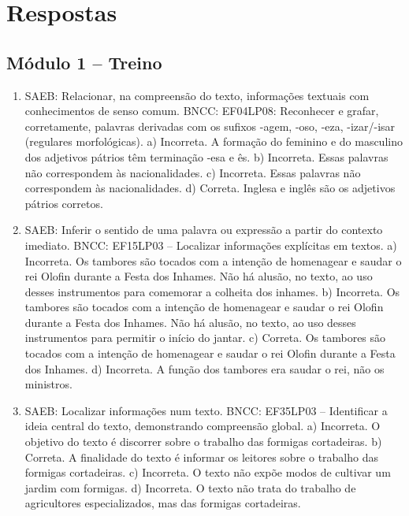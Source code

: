 
\chapter{Respostas}
\pagestyle{plain}
\footnotesize

\pagecolor{gray!40}

\section*{Módulo 1 – Treino}

\begin{enumerate}
\item
SAEB: Relacionar, na compreensão do texto, informações textuais
com conhecimentos de senso comum.
BNCC: EF04LP08: Reconhecer e grafar, corretamente, palavras derivadas
com os sufixos -agem, -oso, -eza, -izar/-isar (regulares morfológicas).
a) Incorreta. A formação do feminino e do masculino dos adjetivos
pátrios têm terminação -esa e ês.
b) Incorreta. Essas palavras não correspondem às nacionalidades.
c) Incorreta. Essas palavras não correspondem às nacionalidades.
d) Correta. Inglesa e inglês são os adjetivos pátrios corretos.

\item
SAEB: Inferir o sentido de uma palavra ou expressão a partir do
contexto imediato.
BNCC: EF15LP03 -- Localizar informações explícitas em textos.
a) Incorreta. Os tambores são tocados com a intenção de homenagear e
saudar o rei Olofin durante a Festa dos Inhames. Não há alusão, no texto, ao uso desses instrumentos para comemorar a colheita dos inhames.
b) Incorreta. Os tambores são tocados com a intenção de homenagear e
saudar o rei Olofin durante a Festa dos Inhames. Não há alusão, no texto, ao uso desses instrumentos para permitir o início do jantar.
c) Correta. Os tambores são tocados com a intenção de homenagear e
saudar o rei Olofin durante a Festa dos Inhames.
d) Incorreta. A função dos tambores era saudar o rei, não os ministros.

\item
SAEB: Localizar informações num texto.
BNCC: EF35LP03 -- Identificar a ideia central do texto, demonstrando
compreensão global.
a) Incorreta. O objetivo do texto é discorrer sobre o trabalho das
formigas cortadeiras.
b) Correta. A finalidade do texto é informar os leitores sobre o
trabalho das formigas cortadeiras.
c) Incorreta. O texto não expõe modos de cultivar um jardim com formigas.
d) Incorreta. O texto não trata do trabalho de agricultores 
especializados, mas das formigas cortadeiras.
\end{enumerate}

